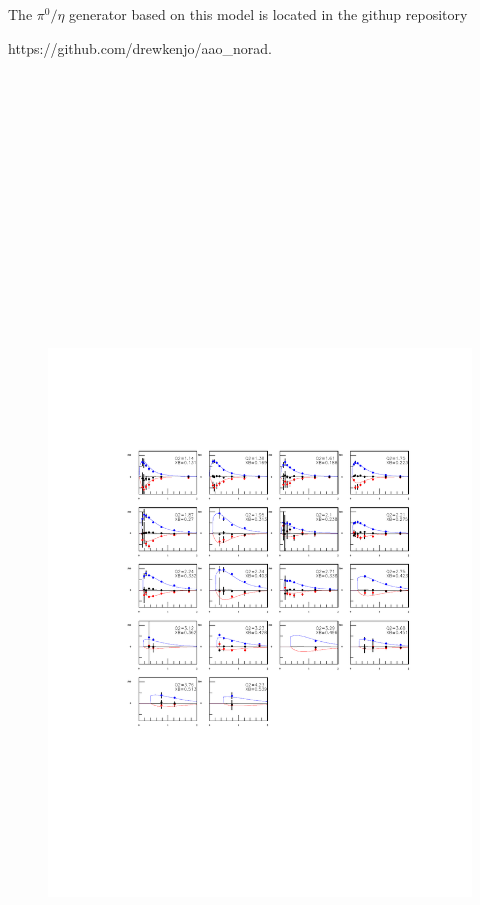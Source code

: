 \documentclass[prc,floatfix,superscriptaddress]{revtex4}
\begin{document}
The $\pi^0/\eta$ generator based on this model is located in the githup repository

{https://github.com/drewkenjo/aao\_norad}.





\begin{figure}[t!]
\vspace*{-10 mm}
\centerline{
\includegraphics[height=30cm]{../Test_plots/pi0_sf.pdf}
}
\end{figure}
\end{document}
